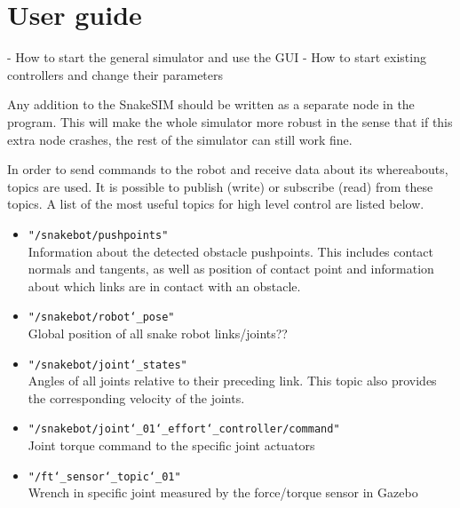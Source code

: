 \section{User guide}

- How to start the general simulator and use the GUI
- How to start existing controllers and change their parameters

Any addition to the SnakeSIM should be written as a separate node in the program. This will make the whole simulator more robust in the sense that if this extra node crashes, the rest of the simulator can still work fine.

In order to send commands to the robot and receive data about its whereabouts, topics are used. It is possible to publish (write) or subscribe (read) from these topics. A list of the most useful topics for high level control are listed below.

\begin{itemize}
    \item \texttt{"/snakebot/pushpoints"}\\
    Information about the detected obstacle pushpoints. This includes contact normals and tangents, as well as position of contact point and information about which links are in contact with an obstacle.
    
    \item \texttt{"/snakebot/robot\char`_pose"}\\
    Global position of all snake robot links/joints??
    
    \item \texttt{"/snakebot/joint\char`_states"}\\
    Angles of all joints relative to their preceding link. This topic also provides the corresponding velocity of the joints.
    
    \item \texttt{"/snakebot/joint\char`_01\char`_effort\char`_controller/command"}\\
    Joint torque command to the specific joint actuators 
    
    \item \texttt{"/ft\char`_sensor\char`_topic\char`_01"}\\
    Wrench in specific joint measured by the force/torque sensor in Gazebo 
\end{itemize}